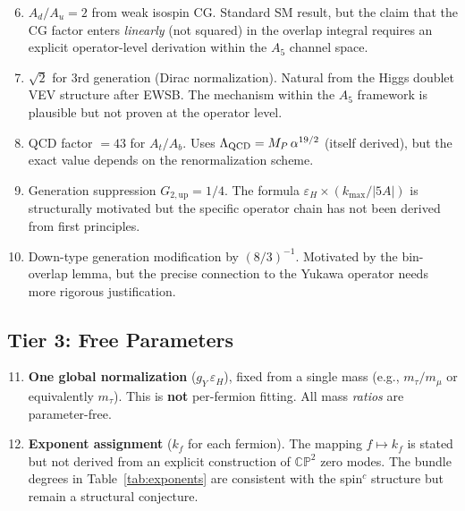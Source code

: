 \documentclass[11pt,a4paper]{article}
\newcommand{\CP}{\mathbb{CP}}
\theoremstyle{definition}
\theoremstyle{remark}
\begin{document}
\begin{enumerate}
\setcounter{enumi}{5}
\item $A_d/A_u = 2$ from weak isospin CG.  Standard SM result, but the claim
  that the CG factor enters \emph{linearly} (not squared) in the overlap integral
  requires an explicit operator-level derivation within the $A_5$ channel space.

\item $\sqrt{2}$ for 3rd generation (Dirac normalization).  Natural from the Higgs
  doublet VEV structure after EWSB.  The mechanism within the $A_5$ framework is
  plausible but not proven at the operator level.

\item QCD factor $= 43$ for $A_t/A_b$.  Uses $\Lambda_{\rm QCD} = M_P\,\alpha^{19/2}$
  (itself derived), but the exact value depends on the renormalization scheme.

\item Generation suppression $G_{2,\text{up}} = 1/4$.  The formula
  $\varepsilon_H \times (k_{\max}/|5A|)$ is structurally motivated but the specific
  operator chain has not been derived from first principles.

\item Down-type generation modification by $(8/3)^{-1}$.  Motivated by the
  bin-overlap lemma, but the precise connection to the Yukawa operator needs
  more rigorous justification.
\end{enumerate}

\subsection{Tier 3: Free Parameters}

\begin{enumerate}
\setcounter{enumi}{10}
\item \textbf{One global normalization} ($g_Y\,\varepsilon_H$), fixed from a single
  mass (e.g., $m_\tau/m_\mu$ or equivalently $m_\tau$).  This is \textbf{not}
  per-fermion fitting.  All mass \emph{ratios} are parameter-free.

\item \textbf{Exponent assignment} ($k_f$ for each fermion).
  The mapping $f \mapsto k_f$ is stated but not derived from an explicit
  construction of $\CP^2$ zero modes.  The bundle degrees in Table~\ref{tab:exponents}
  are consistent with the spin$^c$ structure but remain a structural conjecture.
\end{enumerate}
\end{document}
